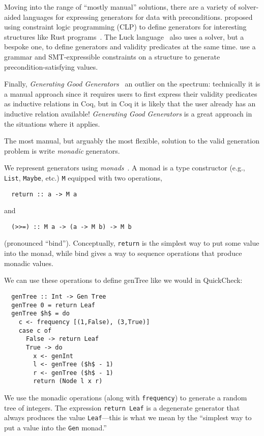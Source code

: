 Moving into the range of ``mostly manual'' solutions, there are a variety of
solver-aided languages for expressing generators for data with preconditions.
\citeauthor{dewey2017automated} proposed using constraint logic programming
(CLP) to define generators for interesting structures like Rust
programs~\cite{dewey2017automated}.  The {\sc Luck} language~\cite{LuckPOPL}
also uses a solver, but a bespoke one, to define generators and validity
predicates at the same time. \citet{steinhofel2022input} use a
grammar and SMT-expressible constraints on a structure to generate
precondition-satisfying values.

Finally, {\em Generating Good Generators}~\cite{lampropoulos2017generating} an
outlier on the spectrum: technically it is a manual approach since it requires
users to first express their validity predicates as inductive relations in Coq,
but in Coq it is likely that the user already has an inductive relation
available! {\em Generating Good Generators} is a great approach in the
situations where it applies.

%
%
The most manual, but arguably the most flexible, solution to the valid
generation problem is write {\em monadic} generators.

We represent generators using {\em monads\/}~\cite{moggi1991notions}. A monad is
a type constructor (e.g., \lstinline{List}, \lstinline{Maybe}, etc.)
\lstinline{M} equipped with two operations,
\begin{lstlisting}
  return :: a -> M a
\end{lstlisting}
\noindent and
\begin{lstlisting}
  (>>=) :: M a -> (a -> M b) -> M b
\end{lstlisting}
\noindent (pronounced ``bind''). Conceptually, \lstinline{return} is the
simplest way to put some value into the monad, while bind gives a way to
sequence operations that produce monadic values.

We can use these operations to define {\sf genTree} like we would in QuickCheck:
\begin{lstlisting}
  genTree :: Int -> Gen Tree
  genTree 0 = return Leaf
  genTree $h$ = do
    c <- frequency [(1,False), (3,True)]
    case c of
      False -> return Leaf
      True -> do
        x <- genInt
        l <- genTree ($h$ - 1)
        r <- genTree ($h$ - 1)
        return (Node l x r)
\end{lstlisting}
We use the monadic operations (along with \lstinline{frequency}) to generate a
random tree of integers. The expression \lstinline{return Leaf} is a degenerate
generator that always produces the value \lstinline{Leaf}---this is what we mean
by the ``simplest way to put a value into the \lstinline{Gen} monad.''

